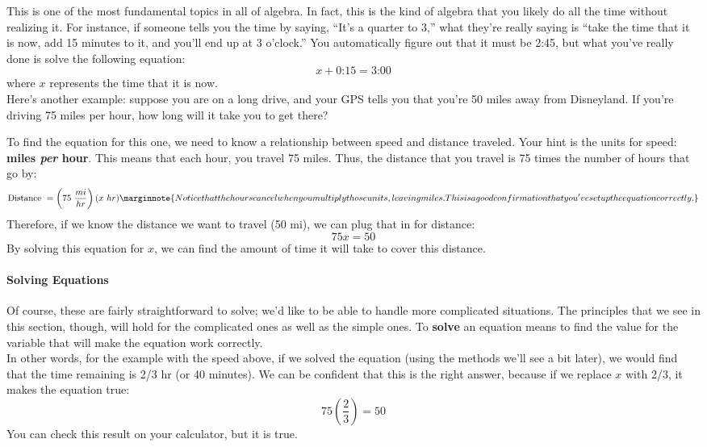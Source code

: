 \setcounter{ExampleCounter}{1}

This is one of the most fundamental topics in all of algebra.  In fact, this is the kind of algebra that you likely do all the time without realizing it.  For instance, if someone tells you the time by saying, ``It's a quarter to 3,'' what they're really saying is ``take the time that it is now, add 15 minutes to it, and you'll end up at 3 o'clock.''  You automatically figure out that it must be 2:45, but what you've really done is solve the following equation: \[x + \textrm{0:15} = \textrm{3:00}\] where $x$ represents the time that it is now.\\

Here's another example: suppose you are on a long drive, and your GPS tells you that you're 50 miles away from Disneyland.  If you're driving 75 miles per hour, how long will it take you to get there?

To find the equation for this one, we need to know a relationship between speed and distance traveled.  Your hint is the units for speed: \textbf{miles \emph{per} hour}.  This means that each hour, you travel 75 miles.  Thus, the distance that you travel is 75 times the number of hours that go by:
\[\textrm{Distance } = \left(75\ \dfrac{mi}{hr}\right) (x \ hr)\marginnote{Notice that the hours cancel when you multiply those units, leaving miles.  This is a good confirmation that you've set up the equation correctly.}\]
Therefore, if we know the distance we want to travel (50 mi), we can plug that in for distance:
\[75x = 50\]
By solving this equation for $x$, we can find the amount of time it will take to cover this distance.

\paragraph{Solving Equations} Of course, these are fairly straightforward to solve; we'd like to be able to handle more complicated situations.  The principles that we see in this section, though, will hold for the complicated ones as well as the simple ones.  To \textbf{solve} an equation means to find the value for the variable that will make the equation work correctly.\\

In other words, for the example with the speed above, if we solved the equation (using the methods we'll see a bit later), we would find that the time remaining is 2/3 hr (or 40 minutes).  We can be confident that this is the right answer, because if we replace $x$ with 2/3, it makes the equation true:
\[75\left(\dfrac{2}{3}\right) = 50\]
You can check this result on your calculator, but it is true.\\

